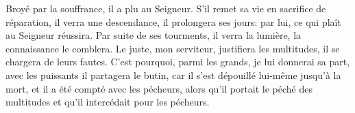 Broyé par la souffrance, il a plu au Seigneur.
S’il remet sa vie en sacrifice de réparation,
	il verra une descendance, il prolongera ses jours:
	par lui, ce qui plaît au Seigneur réussira.
Par suite de ses tourments, il verra la lumière, la connaissance le comblera.
Le juste, mon serviteur, justifiera les multitudes, il se chargera de leurs fautes.
C’est pourquoi, parmi les grands, je lui donnerai sa part,
	avec les puissants il partagera le butin,
	car il s’est dépouillé lui-même jusqu’à la mort,
	et il a été compté avec les pécheurs,
	alors qu’il portait le péché des multitudes et qu’il intercédait pour les pécheurs.
